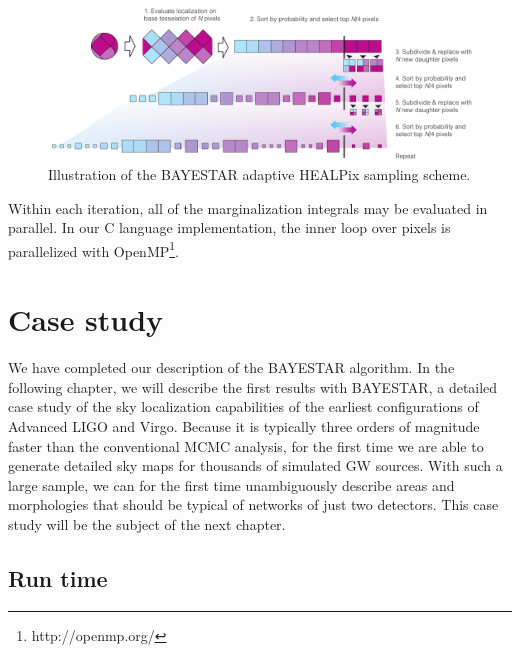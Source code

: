 \documentclass[amsmath,amssymb,aps,prx,reprint,nopreprintnumbers,nofootinbib]{revtex4-1}
\begin{document}
\begin{figure}
    \includegraphics[width=\textwidth]{illustration}
    \caption{\label{fig:adaptive-illustration}Illustration of the \ac{BAYESTAR} adaptive HEALPix sampling scheme.}
\end{figure}

Within each iteration, all of the marginalization integrals may be evaluated in parallel. In our C language implementation, the inner loop over pixels is parallelized with OpenMP\footnote{http://openmp.org/}.

\section{Case study}
\label{sec:case-study}

We have completed our description of the \ac{BAYESTAR} algorithm. In the following chapter, we will describe the first results with \ac{BAYESTAR}, a detailed case study of the sky localization capabilities of the earliest configurations of Advanced \ac{LIGO} and Virgo. Because it is typically three orders of magnitude faster than the conventional \ac{MCMC} analysis, for the first time we are able to generate detailed sky maps for thousands of simulated \ac{GW} sources. With such a large sample, we can for the first time unambiguously describe areas and morphologies that should be typical of networks of just two detectors. This case study will be the subject of the next chapter.

\subsection{Run time}
\label{sec:run-time}
\end{document}
